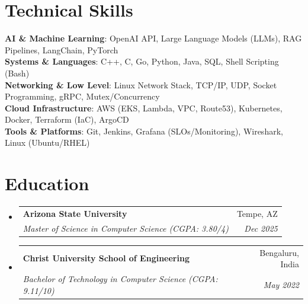 \documentclass[letterpaper,11pt]{article}
\makeatletter
\newcommand{\resumeSubheading}[4]{
  \vspace{-1pt}\item
    \begin{tabular*}{0.98\textwidth}[t]{l@{\extracolsep{\fill}}r}
      \textbf{#1} & #2 \\
      \textit{\small#3} & \textit{\small #4} \\
    \end{tabular*}\vspace{-6pt}
}
\newcommand{\resumeSubHeadingListStart}{\begin{itemize}[leftmargin=0.15in, label={}]}
\newcommand{\resumeSubHeadingListEnd}{\end{itemize}}
\makeatother
\begin{document}
\section{Technical Skills}
 \begin{itemize}[leftmargin=0.15in, label={}]
    \small{\item{
     \textbf{AI \& Machine Learning}{: OpenAI API, Large Language Models (LLMs), RAG Pipelines, LangChain, PyTorch} \\
     \textbf{Systems \& Languages}{: C++, C, Go, Python, Java, SQL, Shell Scripting (Bash)} \\
     \textbf{Networking \& Low Level}{: Linux Network Stack, TCP/IP, UDP, Socket Programming, gRPC, Mutex/Concurrency} \\
     \textbf{Cloud Infrastructure}{: AWS (EKS, Lambda, VPC, Route53), Kubernetes, Docker, Terraform (IaC), ArgoCD} \\
     \textbf{Tools \& Platforms}{: Git, Jenkins, Grafana (SLOs/Monitoring), Wireshark, Linux (Ubuntu/RHEL)}
    }}
 \end{itemize}

\section{Education}
  \resumeSubHeadingListStart
    \resumeSubheading
      {Arizona State University}{Tempe, AZ}
      {Master of Science in Computer Science (CGPA: 3.80/4)}{Dec 2025}
    \resumeSubheading
      {Christ University School of Engineering}{Bengaluru, India}
      {Bachelor of Technology in Computer Science (CGPA: 9.11/10)}{May 2022}
  \resumeSubHeadingListEnd

\end{document}
